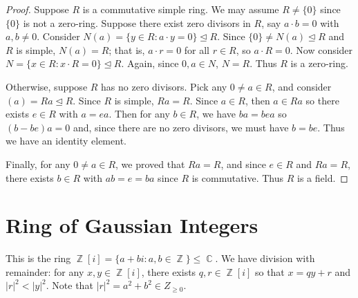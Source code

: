 \documentclass[12pt, a4paper]{book}
\DeclareMathOperator{\Z}{\mathbb{Z}}
\DeclareMathOperator{\C}{\mathbb{C}}
\theoremstyle{nonumberplain}
\newtheorem{proof}{Proof}
\begin{document}
\begin{proof}
    Suppose $R$ is a commutative simple ring.
    We may assume $R\neq\{0\}$ since $\{0\}$ is not a zero-ring.
    Suppose there exist zero divisors in $R$, say $a\cdot b=0$ with $a,b\neq 0$.
    Consider $N(a)=\{y\in R:a\cdot y=0\}\trianglelefteq R$.
    Since $\{0\}\neq N(a)\trianglelefteq R$ and $R$ is simple, $N(a)=R$; that is, $a\cdot r=0$ for all $r\in R$, so $a\cdot R=0$.
    Now consider $N=\{x\in R:x\cdot R=0\}\trianglelefteq R$.
    Again, since $0,a\in N$, $N=R$.
    Thus $R$ is a zero-ring.

    Otherwise, suppose $R$ has no zero divisors.
    Pick any $0\neq a\in R$, and consider $(a)=Ra\trianglelefteq R$.
    Since $R$ is simple, $Ra=R$.
    Since $a\in R$, then $a\in Ra$ so there exists $e\in R$ with $a=ea$.
    Then for any $b\in R$, we have $ba=bea$ so $(b-be)a=0$ and, since there are no zero divisors, we must have $b=be$.
    Thus we have an identity element.

    Finally, for any $0\neq a\in R$, we proved that $Ra=R$, and since $e\in R$ and $Ra=R$, there exists $b\in R$ with $ab=e=ba$ since $R$ is commutative.
    Thus $R$ is a field.
\end{proof}
\section{Ring of Gaussian Integers}
This is the ring $\Z[i]=\{a+bi:a,b\in\Z\}\leq\C$.
We have division with remainder: for any $x,y\in\Z[i]$, there exists $q,r\in\Z[i]$ so that $x=qy+r$ and $|r|^2<|y|^2$.
Note that $|r|^2=a^2+b^2\in Z_{\geq 0}$.
\end{document}
